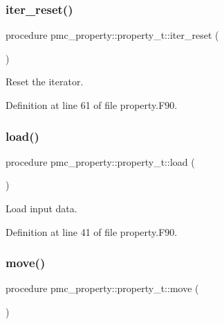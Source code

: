 \subsubsection{\texorpdfstring{iter\+\_\+reset()}{iter\_reset()}}
{\footnotesize\ttfamily procedure pmc\+\_\+property\+::property\+\_\+t\+::iter\+\_\+reset (\begin{DoxyParamCaption}{ }\end{DoxyParamCaption})\hspace{0.3cm}{\ttfamily [private]}}



Reset the iterator. 



Definition at line 61 of file property.\+F90.

\mbox{\label{structpmc__property_1_1property__t_acd27a1e946124e7997f86e633dde1090}} 
\subsubsection{\texorpdfstring{load()}{load()}}
{\footnotesize\ttfamily procedure pmc\+\_\+property\+::property\+\_\+t\+::load (\begin{DoxyParamCaption}{ }\end{DoxyParamCaption})\hspace{0.3cm}{\ttfamily [private]}}



Load input data. 



Definition at line 41 of file property.\+F90.

\mbox{\label{structpmc__property_1_1property__t_aa7409735b20d45715f4ac39dc76de955}} 
\subsubsection{\texorpdfstring{move()}{move()}}
{\footnotesize\ttfamily procedure pmc\+\_\+property\+::property\+\_\+t\+::move (\begin{DoxyParamCaption}{ }\end{DoxyParamCaption})\hspace{0.3cm}{\ttfamily [private]}}



